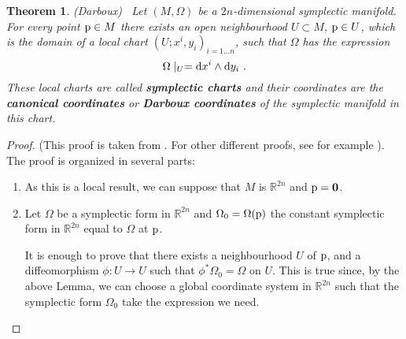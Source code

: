 \documentclass[12pt]{report}
\newtheorem{teor}{Theorem}[chapter]
\def\d{{\rm d}}
\def\Real{\mathbb{R}}
\begin{document}
\begin{teor}
{\rm (Darboux)} \
Let $(M,\Omega )$ be a $2n$-dimensional symplectic manifold.
For every point ${\rm p}\in M$ there exists an open neighbourhood
$U \subset M$, ${\rm p}\in U$, 
which is the domain of a local chart $(U;x^i,y_i)_{i=1 \ldots n}$,
such that $\Omega$ has the expression
$$
\Omega \mid_U = \d x^i \wedge \d y_i \ .
$$
These local charts are called {\sl \textbf{symplectic charts}}
and their coordinates are the {\sl \textbf{canonical coordinates}} or
 {\sl \textbf{Darboux coordinates}} of the symplectic manifold in this chart.
\end{teor}
\begin{proof} 
(This proof is taken from \cite{AM-78}. For other different proofs, see for example
\cite{book:Bryantetal, CP-adg, dLGRR-2023}).
The proof is organized in several parts:
\begin{enumerate}
\item As this is a local result, we can suppose that $M$ is $\Real^{2n}$ and ${\rm p}={\bf 0}$.
\item Let $\Omega$ be a symplectic form in $\Real^{2n}$ and $\Omega_{0}=\Omega({\rm p})$ the constant symplectic form in $\Real^{2n}$ equal to  $\Omega$ at ${\rm p}$. 

It is enough to prove that there exists a neighbourhood $U$ of ${\rm p}$, and a diffeomorphism $\phi:U\to U$ such that $\phi^{*}\Omega_{0}=\Omega$ on $U$. This is true since, by the above Lemma, we can choose a global coordinate system in $\Real^{2n}$ such that the symplectic form $\Omega_{0}$ take the expression we need.


\end{enumerate}
\end{proof}
\end{document}
